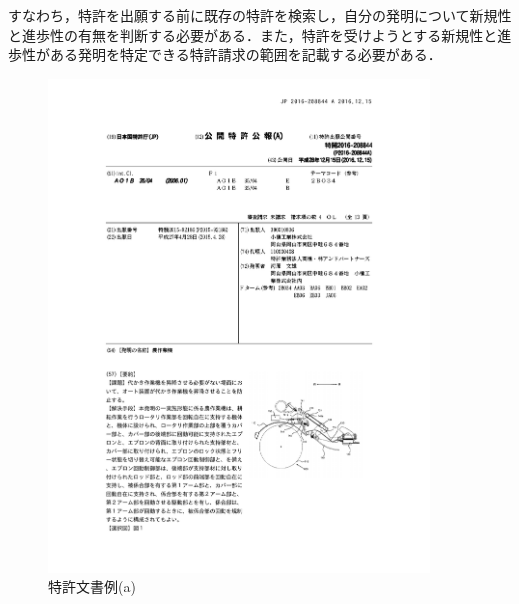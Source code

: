 \documentclass[master]{suribt}
\theoremstyle{definition}
\begin{document}
 すなわち，特許を出願する前に既存の特許を検索し，自分の発明について新規性と進歩性の有無を判断する必要がある．また，特許を受けようとする新規性と進歩性がある発明を特定できる特許請求の範囲を記載する必要がある．
 \begin{figure}
  \center
  \includegraphics[width=0.9\textwidth,bb= 92 67 520 760]{ex1-1.pdf}
   \caption{特許文書例(a)}
   \label{fig:expa}
 \end{figure}
\end{document}
